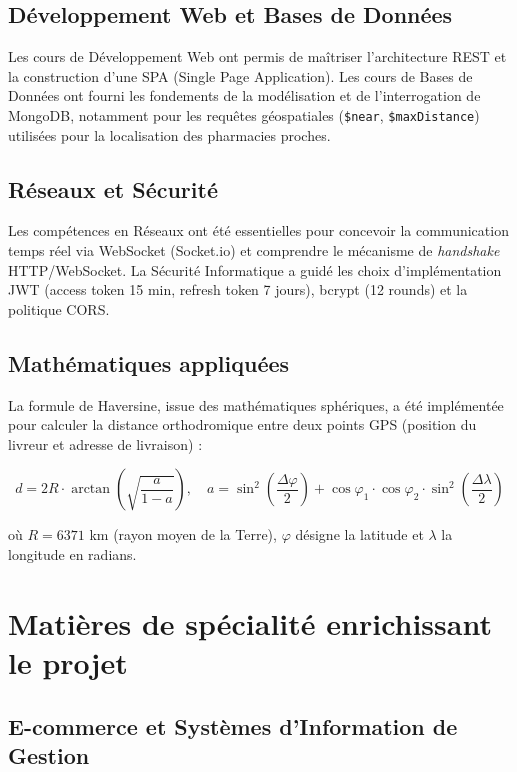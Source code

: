 \documentclass[12pt,a4paper,oneside]{report}
\begin{document}
\subsection{Développement Web et Bases de Données}

Les cours de Développement Web ont permis de maîtriser l'architecture REST et la construction d'une SPA (Single Page Application). Les cours de Bases de Données ont fourni les fondements de la modélisation et de l'interrogation de MongoDB, notamment pour les requêtes géospatiales (\texttt{\$near}, \texttt{\$maxDistance}) utilisées pour la localisation des pharmacies proches.

\subsection{Réseaux et Sécurité}

Les compétences en Réseaux ont été essentielles pour concevoir la communication temps réel via WebSocket (Socket.io) et comprendre le mécanisme de \textit{handshake} HTTP/WebSocket. La Sécurité Informatique a guidé les choix d'implémentation JWT (access token 15 min, refresh token 7 jours), bcrypt (12 rounds) et la politique CORS.

\subsection{Mathématiques appliquées}

La formule de Haversine, issue des mathématiques sphériques, a été implémentée pour calculer la distance orthodromique entre deux points GPS (position du livreur et adresse de livraison) :

$$d = 2R \cdot \arctan\left(\sqrt{\frac{a}{1-a}}\right), \quad a = \sin^2\!\left(\frac{\Delta\varphi}{2}\right) + \cos\varphi_1 \cdot \cos\varphi_2 \cdot \sin^2\!\left(\frac{\Delta\lambda}{2}\right)$$

où $R = 6371$ km (rayon moyen de la Terre), $\varphi$ désigne la latitude et $\lambda$ la longitude en radians.

\section{Matières de spécialité enrichissant le projet}

\subsection{E-commerce et Systèmes d'Information de Gestion}
\end{document}
